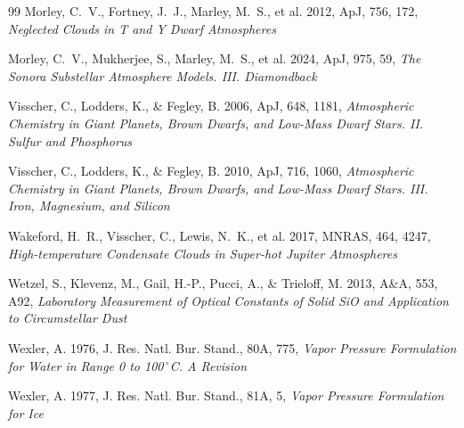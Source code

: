 \documentclass[11pt,a4paper]{article}
\begin{document}
\begin{thebibliography}{99}
Morley, C.~V., Fortney, J.~J., Marley, M.~S., et al. 2012, ApJ, 756, 172,
\emph{Neglected Clouds in T and Y Dwarf Atmospheres}

Morley, C.~V., Mukherjee, S., Marley, M.~S., et al. 2024, ApJ, 975, 59,
\emph{The Sonora Substellar Atmosphere Models. III. Diamondback}

Visscher, C., Lodders, K., \& Fegley, B. 2006, ApJ, 648, 1181,
\emph{Atmospheric Chemistry in Giant Planets, Brown Dwarfs, and Low-Mass
Dwarf Stars. II. Sulfur and Phosphorus}

Visscher, C., Lodders, K., \& Fegley, B. 2010, ApJ, 716, 1060,
\emph{Atmospheric Chemistry in Giant Planets, Brown Dwarfs, and Low-Mass
Dwarf Stars. III. Iron, Magnesium, and Silicon}

Wakeford, H.~R., Visscher, C., Lewis, N.~K., et al. 2017, MNRAS, 464, 4247,
\emph{High-temperature Condensate Clouds in Super-hot Jupiter Atmospheres}

Wetzel, S., Klevenz, M., Gail, H.-P., Pucci, A., \& Trieloff, M. 2013,
A\&A, 553, A92, \emph{Laboratory Measurement of Optical Constants of Solid
SiO and Application to Circumstellar Dust}

Wexler, A. 1976, J. Res. Natl. Bur. Stand., 80A, 775,
\emph{Vapor Pressure Formulation for Water in Range 0 to 100\,$^\circ$C.
A Revision}

Wexler, A. 1977, J. Res. Natl. Bur. Stand., 81A, 5,
\emph{Vapor Pressure Formulation for Ice}

\end{thebibliography}
\end{document}
